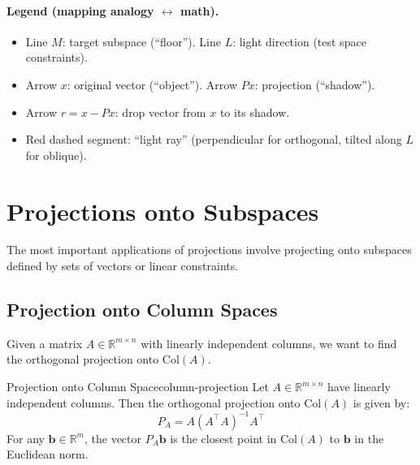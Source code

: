 \paragraph{Legend (mapping analogy \(\leftrightarrow\) math).}
\begin{itemize}
    \item Line \(M\): target subspace (“floor”). \quad Line \(L\): light direction (test space constraints).
    \item Arrow \(x\): original vector (“object”). \quad Arrow \(Px\): projection (“shadow”).
    \item Arrow \(r=x-Px\): drop vector from \(x\) to its shadow.
    \item Red dashed segment: “light ray” (perpendicular for orthogonal, tilted along \(L\) for oblique).
\end{itemize}



\section{Projections onto Subspaces}

The most important applications of projections involve projecting onto subspaces defined by sets of vectors or linear constraints.

\subsection{Projection onto Column Spaces}

Given a matrix $A  \in  \mathbb{R}^{m \times n}$ with linearly independent columns, we want to find the orthogonal projection onto $\text{Col}(A)$.

\begin{theorem}{Projection onto Column Space}{column-projection}
    Let $A  \in  \mathbb{R}^{m \times n}$ have linearly independent columns. Then the orthogonal projection onto $\text{Col}(A)$ is given by:
    \[
        P_A = A(A^{\top} A)^{-1} A^{\top}
    \]
    For any $\mathbf{b}  \in  \mathbb{R}^m$, the vector $P_A \mathbf{b}$ is the closest point in $\text{Col}(A)$ to $\mathbf{b}$ in the Euclidean norm.
\end{theorem}

